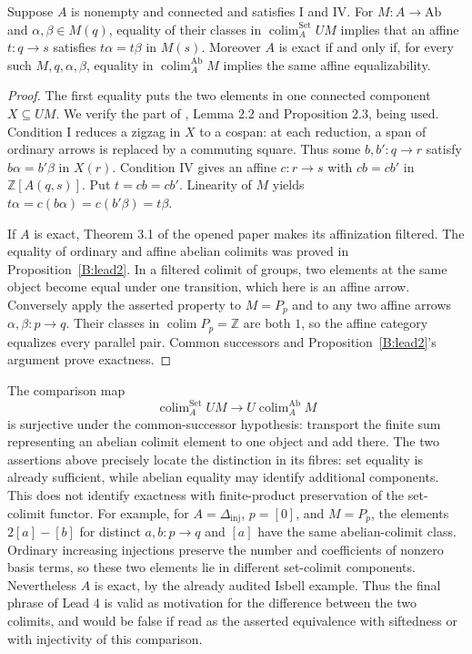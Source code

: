 \begin{proposition}\label{B:lead4}
Suppose $A$ is nonempty and connected and satisfies I and IV.  For
$M:A\to\mathrm{Ab}$ and $\alpha,\beta\in M(q)$, equality of their
classes in $\operatorname{colim}^{\mathrm{Set}}_A UM$ implies that
an affine $t:q\to s$ satisfies $t\alpha=t\beta$ in $M(s)$.
Moreover $A$ is exact if and only if, for every such $M,q,\alpha,\beta$,
equality in $\operatorname{colim}^{\mathrm{Ab}}_A M$ implies the
same affine equalizability.
\end{proposition}
\begin{proof}
The first equality puts the two elements in one connected component
$X\subseteq UM$.  We verify the part of
\cite{IsbellMitchell1976}, Lemma 2.2 and Proposition 2.3, being used.
Condition I reduces a zigzag in $X$ to a cospan: at each reduction, a
span of ordinary arrows is replaced by a commuting square.  Thus some
$b,b':q\to r$ satisfy $b\alpha=b'\beta$ in $X(r)$.
Condition IV gives an affine $c:r\to s$ with $cb=cb'$ in
$\mathbb Z[A(q,s)]$.  Put $t=cb=cb'$.  Linearity of $M$ yields
$t\alpha=c(b\alpha)=c(b'\beta)=t\beta$.

If $A$ is exact, Theorem 3.1 of the opened paper makes its affinization
filtered.  The equality of ordinary and affine abelian colimits was
proved in Proposition~\ref{B:lead2}.  In a filtered colimit of groups,
two elements at the same object become equal under one transition,
which here is an affine arrow.  Conversely apply the asserted property
to $M=P_p$ and to any two affine arrows $\alpha,\beta:p\to q$.
Their classes in $\operatorname{colim}P_p=\mathbb Z$ are both $1$,
so the affine category equalizes every parallel pair.  Common
successors and Proposition~\ref{B:lead2}'s argument prove exactness.
\end{proof}

\begin{remark}\label{B:lead4-scope}
The comparison map
\[
 \operatorname{colim}^{\mathrm{Set}}_A UM\longrightarrow
 U\operatorname{colim}^{\mathrm{Ab}}_A M
\]
is surjective under the common-successor hypothesis: transport the
finite sum representing an abelian colimit element to one object and
add there.  The two assertions above precisely locate the distinction
in its fibres: set equality is already sufficient, while abelian
equality may identify additional components.  This does not identify
exactness with finite-product preservation of the set-colimit functor.
For example, for $A=\Delta_{\mathrm{inj}}$, $p=[0]$, and $M=P_p$,
the elements $2[a]-[b]$ for distinct $a,b:p\to q$ and $[a]$ have the
same abelian-colimit class.  Ordinary increasing injections preserve
the number and coefficients of nonzero basis terms, so these two
elements lie in different set-colimit components.  Nevertheless $A$
is exact, by the already audited Isbell example.  Thus the final phrase
of Lead 4 is valid as motivation for the difference between the two
colimits, and would be false if read as the asserted equivalence with
siftedness or with injectivity of this comparison.
\end{remark}

